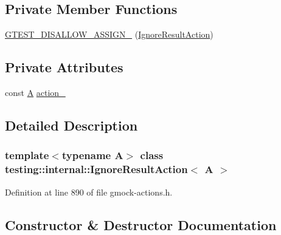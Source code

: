 \subsection*{Private Member Functions}
\begin{DoxyCompactItemize}
\item 
\hyperlink{classtesting_1_1internal_1_1IgnoreResultAction_a6d42dfd3fd05fbbd24f6856e7bd82ab9}{G\+T\+E\+S\+T\+\_\+\+D\+I\+S\+A\+L\+L\+O\+W\+\_\+\+A\+S\+S\+I\+G\+N\+\_\+} (\hyperlink{classtesting_1_1internal_1_1IgnoreResultAction}{Ignore\+Result\+Action})
\end{DoxyCompactItemize}
\subsection*{Private Attributes}
\begin{DoxyCompactItemize}
\item 
const \hyperlink{namespacetesting_a5e9134d655d2fc9323902348083282e7}{A} \hyperlink{classtesting_1_1internal_1_1IgnoreResultAction_a3a1ad6d29d904acb4ca41eeee45de4a0}{action\+\_\+}
\end{DoxyCompactItemize}


\subsection{Detailed Description}
\subsubsection*{template$<$typename A$>$\newline
class testing\+::internal\+::\+Ignore\+Result\+Action$<$ A $>$}



Definition at line 890 of file gmock-\/actions.\+h.



\subsection{Constructor \& Destructor Documentation}
\mbox{\label{classtesting_1_1internal_1_1IgnoreResultAction_a9199f7b1b7771b2e2a5fd28caf624623}} 
